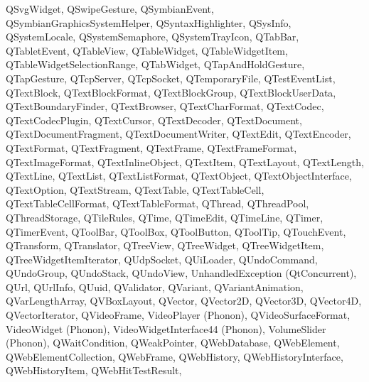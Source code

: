 {{        QSvgWidget,
        QSwipeGesture,
        QSymbianEvent,
        QSymbianGraphicsSystemHelper,
        QSyntaxHighlighter,
        QSysInfo,
        QSystemLocale,
        QSystemSemaphore,
        QSystemTrayIcon,
        QTabBar,
        QTabletEvent,
        QTableView,
        QTableWidget,
        QTableWidgetItem,
        QTableWidgetSelectionRange,
        QTabWidget,
        QTapAndHoldGesture,
        QTapGesture,
        QTcpServer,
        QTcpSocket,
        QTemporaryFile,
        QTestEventList,
        QTextBlock,
        QTextBlockFormat,
        QTextBlockGroup,
        QTextBlockUserData,
        QTextBoundaryFinder,
        QTextBrowser,
        QTextCharFormat,
        QTextCodec,
        QTextCodecPlugin,
        QTextCursor,
        QTextDecoder,
        QTextDocument,
        QTextDocumentFragment,
        QTextDocumentWriter,
        QTextEdit,
        QTextEncoder,
        QTextFormat,
        QTextFragment,
        QTextFrame,
        QTextFrameFormat,
        QTextImageFormat,
        QTextInlineObject,
        QTextItem,
        QTextLayout,
        QTextLength,
        QTextLine,
        QTextList,
        QTextListFormat,
        QTextObject,
        QTextObjectInterface,
        QTextOption,
        QTextStream,
        QTextTable,
        QTextTableCell,
        QTextTableCellFormat,
        QTextTableFormat,
        QThread,
        QThreadPool,
        QThreadStorage,
        QTileRules,
        QTime,
        QTimeEdit,
        QTimeLine,
        QTimer,
        QTimerEvent,
        QToolBar,
        QToolBox,
        QToolButton,
        QToolTip,
        QTouchEvent,
        QTransform,
        QTranslator,
        QTreeView,
        QTreeWidget,
        QTreeWidgetItem,
        QTreeWidgetItemIterator,
        QUdpSocket,
        QUiLoader,
        QUndoCommand,
        QUndoGroup,
        QUndoStack,
        QUndoView,
        UnhandledException (QtConcurrent),
        QUrl,
        QUrlInfo,
        QUuid,
        QValidator,
        QVariant,
        QVariantAnimation,
        QVarLengthArray,
        QVBoxLayout,
        QVector,
        QVector2D,
        QVector3D,
        QVector4D,
        QVectorIterator,
        QVideoFrame,
        VideoPlayer (Phonon),
        QVideoSurfaceFormat,
        VideoWidget (Phonon),
        VideoWidgetInterface44 (Phonon),
        VolumeSlider (Phonon),
        QWaitCondition,
        QWeakPointer,
        QWebDatabase,
        QWebElement,
        QWebElementCollection,
        QWebFrame,
        QWebHistory,
        QWebHistoryInterface,
        QWebHistoryItem,
        QWebHitTestResult,
}}
